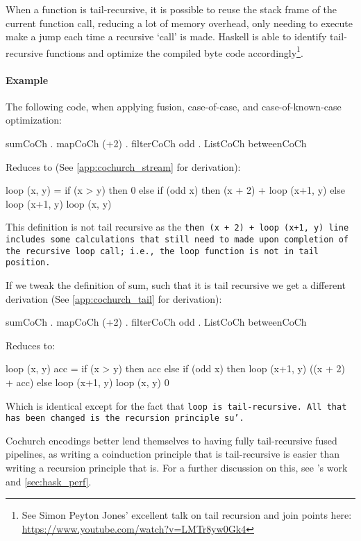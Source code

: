When a function is tail-recursive, it is possible to reuse the stack frame of the current function call, reducing a lot of memory overhead, only needing to execute make a jump each time a recursive `call' is made.
Haskell is able to identify tail-recursive functions and optimize the compiled byte code accordingly\footnote{See Simon Peyton Jones' excellent talk on tail recursion and join points here: \url{https://www.youtube.com/watch?v=LMTr8yw0Gk4}}.

\paragraph{Example}
The following code, when applying fusion, case-of-case, and case-of-known-case optimization:
\begin{spec}
sumCoCh . mapCoCh (+2) . filterCoCh odd . ListCoCh betweenCoCh
\end{spec}
Reduces to (See \autoref{app:cochurch_stream} for derivation):
\begin{spec}
loop (x, y) = if (x > y)
              then 0
              else if (odd x)
                   then (x + 2) + loop (x+1, y)
                   else loop (x+1, y)
loop (x, y)
\end{spec}
This definition is not tail recursive as the \tt{then (x + 2) + loop (x+1, y)} line includes some calculations that still need to made upon completion of the recursive \tt{loop} call; i.e., the \tt{loop} function is not in tail position.

If we tweak the definition of sum, such that it is tail recursive we get a different derivation (See \autoref{app:cochurch_tail} for derivation):
\begin{spec}
sumCoCh . mapCoCh (+2) . filterCoCh odd . ListCoCh betweenCoCh
\end{spec}
Reduces to:
\begin{spec}
loop (x, y) acc = if (x > y)
                  then acc
                  else if (odd x)
                       then loop (x+1, y) ((x + 2) + acc)
                       else loop (x+1, y)
loop (x, y) 0
\end{spec}
Which is identical except for the fact that \tt{loop} is tail-recursive.
All that has been changed is the recursion principle \tt{su'}.

Cochurch encodings better lend themselves to having fully tail-recursive fused pipelines, as writing a coinduction principle that is tail-recursive is easier than writing a recursion principle that is.
For a further discussion on this, see \cite{Breitner2018}'s work and \autoref{sec:hask_perf}.


